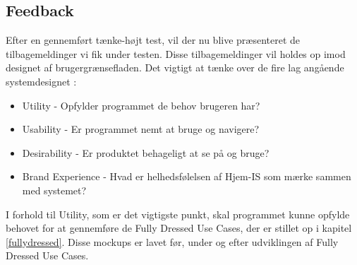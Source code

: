 \subsection{Feedback}
Efter en gennemført tænke-højt test, vil der nu blive præsenteret de tilbagemeldinger vi fik under testen. Disse tilbagemeldinger vil holdes op imod designet af brugergrænsefladen. Det vigtigt at tænke over de fire lag angående systemdesignet \cite{UIdesign}:
\begin{itemize}
    \item Utility - Opfylder programmet de behov brugeren har?
    \item Usability - Er programmet nemt at bruge og navigere?
    \item Desirability - Er produktet behageligt at se på og bruge?
    \item Brand Experience - Hvad er helhedsfølelsen af Hjem-IS som mærke sammen med systemet?
\end{itemize}
I forhold til Utility, som er det vigtigste punkt, skal programmet kunne opfylde behovet for at gennemføre de Fully Dressed Use Cases, der er stillet op i kapitel \ref{fullydressed}. Disse mockups er lavet før, under og efter udviklingen af Fully Dressed Use Cases.



